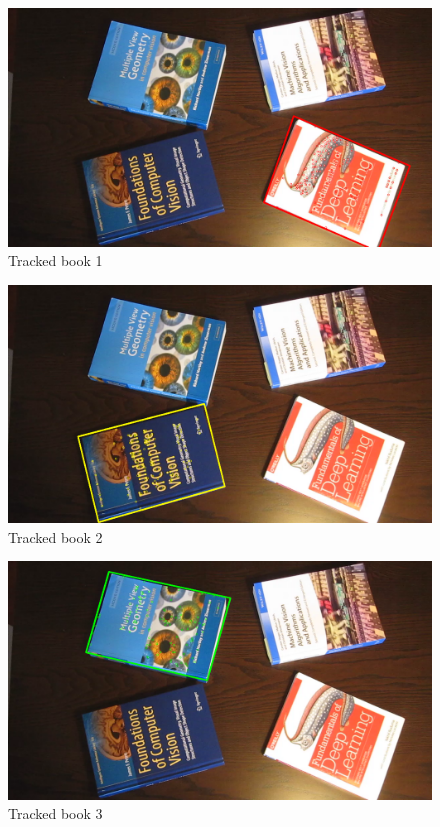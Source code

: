 \documentclass[a4paper,11pt]{article}
\begin{document}
\begin{figure}[ht]
    \centering
    \includegraphics[width=\textwidth]{imgs/TrackedFeatures0.png}
    \caption{Tracked book 1}
    \label{fig:book1}
\end{figure}

\begin{figure}[ht]
    \centering
    \includegraphics[width=\textwidth]{imgs/TrackedFeatures1.png}
    \caption{Tracked book 2}
    \label{fig:book2}
\end{figure}

\begin{figure}[ht]
    \centering
    \includegraphics[width=\textwidth]{imgs/TrackedFeatures2.png}
    \caption{Tracked book 3}
    \label{fig:book3}
\end{figure}
\end{document}
